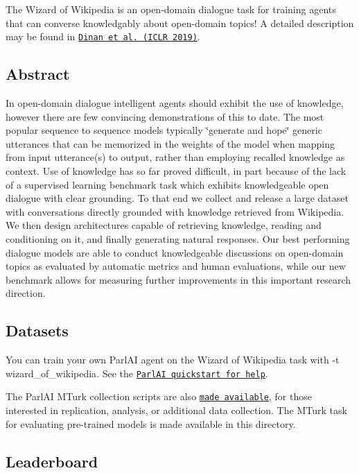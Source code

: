 

The Wizard of Wikipedia is an open-\/domain dialogue task for training agents that can converse knowledgably about open-\/domain topics! A detailed description may be found in \href{https://arxiv.org/abs/1811.01241}{\tt Dinan et al. (I\+C\+LR 2019)}.

\subsection*{Abstract}

In open-\/domain dialogue intelligent agents should exhibit the use of knowledge, however there are few convincing demonstrations of this to date. The most popular sequence to sequence models typically \char`\"{}generate and hope\char`\"{} generic utterances that can be memorized in the weights of the model when mapping from input utterance(s) to output, rather than employing recalled knowledge as context. Use of knowledge has so far proved difficult, in part because of the lack of a supervised learning benchmark task which exhibits knowledgeable open dialogue with clear grounding. To that end we collect and release a large dataset with conversations directly grounded with knowledge retrieved from Wikipedia. We then design architectures capable of retrieving knowledge, reading and conditioning on it, and finally generating natural responses. Our best performing dialogue models are able to conduct knowledgeable discussions on open-\/domain topics as evaluated by automatic metrics and human evaluations, while our new benchmark allows for measuring further improvements in this important research direction.

\subsection*{Datasets}

You can train your own Parl\+AI agent on the Wizard of Wikipedia task with {\ttfamily -\/t wizard\+\_\+of\+\_\+wikipedia}. See the \href{http://www.parl.ai/static/docs/tutorial_quick.html}{\tt Parl\+AI quickstart for help}.

The Parl\+AI M\+Turk collection scripts are also \href{https://github.com/facebookresearch/ParlAI/tree/master/parlai/mturk/tasks/wizard_of_wikipedia}{\tt made available}, for those interested in replication, analysis, or additional data collection. The M\+Turk task for evaluating pre-\/trained models is made available in this directory.

\subsection*{Leaderboard}

